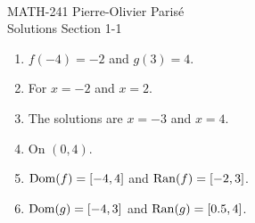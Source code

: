 


	\noindent \hrulefill \\
	MATH-241 \hfill Pierre-Olivier Paris{\'e}\\
	Solutions Section 1-1 \hfill \semester \\\vspace*{-1cm}
	
	\noindent\hrulefill
	
	\spc
	
	
	\begin{enumerate}[label=(\alph*)]
	\item $f(-4) = -2$ and $g(3) = 4$.
	\item For $x = -2$ and $x = 2$.
	\item The solutions are $x = -3$ and $x = 4$.
	\item On $(0, 4)$.
	\item $\operatorname{Dom} (f) = [-4, 4]$ and $\operatorname{Ran} (f) = [-2, 3]$.
	\item $\operatorname{Dom} (g) = [-4, 3]$ and $\operatorname{Ran} (g) = [0.5, 4]$.
	\end{enumerate}
	

